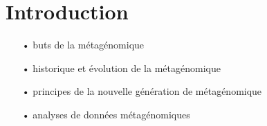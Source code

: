 \section{Introduction}

	\begin{itemize}
		\item[•] buts de la métagénomique
		\item[•] historique et évolution de la métagénomique
		\item[•] principes de la nouvelle génération de métagénomique
		\item[•] analyses de données métagénomiques
	\end{itemize}
